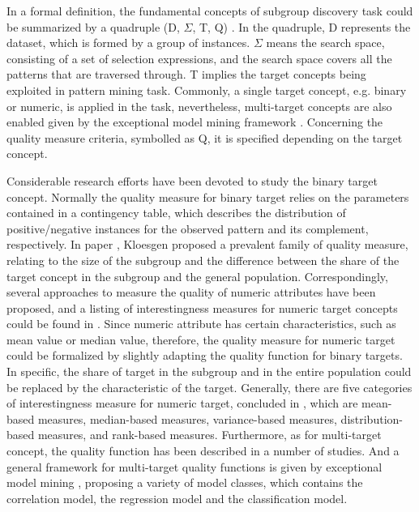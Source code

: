In a formal definition, the fundamental concepts of subgroup discovery task could be summarized by a quadruple (D, $\Sigma$, T, Q) \cite{lemmerich2014novel}. In the quadruple, D represents the dataset, which is formed by a group of instances. $\Sigma$ means the search space, consisting of a set of selection expressions, and the search space covers all the patterns that are traversed through. T implies the target concepts being exploited in pattern mining task. Commonly, a single target concept, e.g. binary or numeric, is applied in the task, nevertheless, multi-target concepts are also enabled given by the exceptional model mining framework \cite{leman2008exceptional}. Concerning the quality measure criteria, symbolled as Q, it is specified depending on the target concept. 

Considerable research efforts have been devoted to study the binary target concept. Normally the quality measure for binary target relies on the parameters contained in a contingency table, which describes the distribution of positive/negative instances for the observed pattern and its complement, respectively. In paper \cite{klosgen1996explora}, Kloesgen proposed a prevalent family of quality measure, relating to the size of the subgroup and the difference between the share of the target concept in the subgroup and the general population. Correspondingly, several approaches to measure the quality of numeric attributes have been proposed, and a listing of interestingness measures for numeric target concepts could be found in \cite{pieters2010subgroup}. Since numeric attribute has certain characteristics, such as mean value or median value, therefore, the quality measure for numeric target could be formalized by slightly adapting the quality function for binary targets. In specific, the share of target in the subgroup and in the entire population could be replaced by the characteristic of the target. Generally, there are five categories of interestingness measure for numeric target, concluded in \cite{lemmerich2014novel}, which are mean-based measures, median-based measures, variance-based measures, distribution-based measures, and rank-based measures. Furthermore, as for multi-target concept, the quality function has been described in a number of studies. And a general framework for multi-target quality functions is given by exceptional model mining \cite{leman2008exceptional}, proposing a variety of model classes, which contains the correlation model, the regression model and the classification model.  

